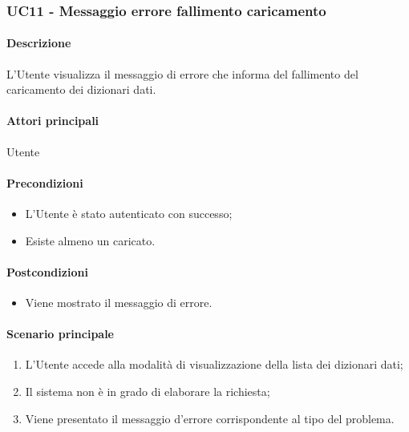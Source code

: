\subsubsection{UC11 - Messaggio errore fallimento caricamento }\label{UC11}
\paragraph*{Descrizione}
L’Utente visualizza il messaggio di errore che informa del fallimento del caricamento dei dizionari dati.

\paragraph*{Attori principali}
Utente

\paragraph*{Precondizioni}
\begin{itemize}
  \item L’Utente è stato autenticato con successo;
  \item Esiste almeno un  caricato.  
\end{itemize}

\paragraph*{Postcondizioni}
\begin{itemize}
  \item Viene mostrato il messaggio di errore.
\end{itemize}

\paragraph*{Scenario principale}
\begin{enumerate}
  \item L’Utente accede alla modalità di visualizzazione della lista dei dizionari dati;
  \item Il sistema non è in grado di elaborare la richiesta;
  \item Viene presentato il messaggio d’errore corrispondente al tipo del problema.  
\end{enumerate}
